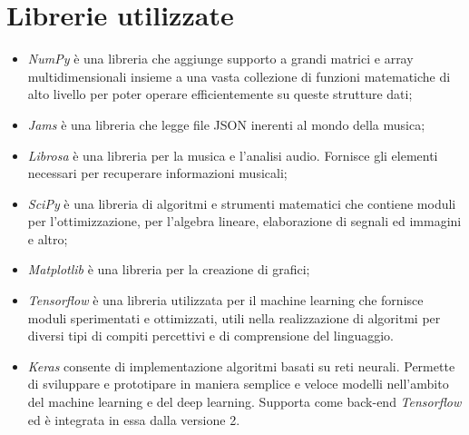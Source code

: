 \section{Librerie utilizzate}
\begin{itemize}
	\item \textit{NumPy} è una libreria che aggiunge supporto a grandi matrici e array multidimensionali insieme a una vasta collezione di funzioni matematiche di alto livello per poter operare efficientemente su queste strutture dati;
	\item \textit{Jams} è una libreria che legge file JSON inerenti al mondo della musica;
	\item \textit{Librosa} è una libreria per la musica e l'analisi audio. Fornisce gli elementi necessari per recuperare informazioni musicali;
	\item \textit{SciPy} è una libreria di algoritmi e strumenti matematici che contiene moduli per l'ottimizzazione, per l'algebra lineare, elaborazione di segnali ed immagini e altro;
	\item \textit{Matplotlib} è una libreria per la creazione di grafici;
	\item \textit{Tensorflow} è una libreria utilizzata per il machine learning che fornisce moduli sperimentati e ottimizzati, utili nella realizzazione di algoritmi per diversi tipi di compiti percettivi e di comprensione del linguaggio.
	\item \textit{Keras} consente di implementazione algoritmi basati su reti neurali. Permette di sviluppare e prototipare in maniera semplice e veloce modelli nell’ambito del machine learning e del deep learning. Supporta come back-end \textit{Tensorflow} ed è integrata in essa dalla versione 2.
\end{itemize}

